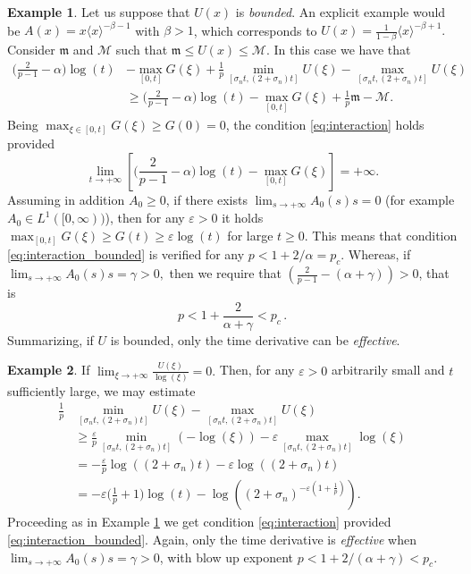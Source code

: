 \documentclass[11pt,reqno]{amsart}
\theoremstyle{definition}
\newtheorem{example}{Example}
\numberwithin{equation}{section}
\begin{document}
\begin{example}
\label{ex:boundedcase}
Let us suppose that $U(x)$ is \textit{bounded}. An explicit example would be $A(x)=x\langle  x\rangle^{-\beta-1}$ with $\beta>1$, which corresponds to $U(x)=\frac{1}{1-\beta} \langle x\rangle^{-\beta+1}.$  \\
Consider $\mathfrak{m}$ and $\mathcal{M}$ such that $\mathfrak{m}\leq U(x)\leq \mathcal{M}.$ In this case we have that
%
\begin{align*}
\Big(\frac{2}{p-1}-\alpha\Big)\log(t)&-\max_{[0,t]}G(\xi)
    +\frac{1}{p} \min_{[\sigma_n t,(2+\sigma_n)t]} U(\xi) -\max_{[\sigma_n t,(2+\sigma_n)t]} U(\xi) \\
 &   \geq \Big(\frac{2}{p-1}-\alpha\Big)\log(t)-\max_{[0,t]}G(\xi)
    +\frac{1}{p} \mathfrak{m}-\mathcal{M}. 
    \end{align*}
Being $\displaystyle{\max_{\xi\in [0,t]}G(\xi)}\geq G(0)=0$, the condition \eqref{eq:interaction} holds provided
\begin{equation}
\label{eq:interaction_bounded}
    \lim_{t\to+\infty} \left[\Big(\frac{2}{p-1}-\alpha\Big)\log(t)-\max_{[0,t]}G(\xi)\right]
    =+\infty.
\end{equation}
Assuming in addition $A_0\geq 0$, if there exists $\displaystyle{\lim_{s\to +\infty}}A_0(s)s=0$ (for example $A_0\in L^1([0,\infty))$), then for any $\varepsilon>0$ it holds $\displaystyle{\max_{[0,t]}G(\xi)\geq G(t)\geq \varepsilon\log(t)} $ for large $t\geq 0$. This means that condition \eqref{eq:interaction_bounded} is verified for any $p<1+2/\alpha=p_c$. 
Whereas, if $\displaystyle{\lim_{s\to +\infty}}A_0(s)s=\gamma>0,$ then we require that  $\left(\frac{2}{p-1}-\left(\alpha+\gamma\right)\right)>0$, that is 
\[p<1+\frac{2}{\alpha+\gamma}<p_c\,.\]
Summarizing, if $U$ is bounded,  only the time derivative can be \emph{effective}.
\end{example}
\begin{example}\label{ex:3}
If $\displaystyle{\lim_{\xi \to+\infty}}\frac{U(\xi)}{\log(\xi)}= 0.$ 
Then, for any $\varepsilon>0$ arbitrarily small and $t$ sufficiently large, we may estimate
%
\begin{align*}
\frac{1}{p} &\min_{[\sigma_n t,(2+\sigma_n)t]} U(\xi) -\max_{[\sigma_n t,(2+\sigma_n)t]} U(\xi) \\
 &   \geq 
    \frac{\varepsilon }{p} \min_{[\sigma_n t,(2+\sigma_n)t]} (-\log (\xi)) - \varepsilon \max_{[\sigma_n t,(2+\sigma_n)t]} \log (\xi) \\
%
 &   = 
    -\frac{\varepsilon }{p} \log ((2+\sigma_n) t) - \varepsilon \log ((2+\sigma_n)t)\\
%
& = -\varepsilon\Big(\frac{1}{p}+1\Big)\log(t)- \log\left((2+\sigma_n)^{-\varepsilon(1+\frac{1}{p})}\right).
    \end{align*}
%
Proceeding as in Example \ref{ex:boundedcase} we get
condition \eqref{eq:interaction} provided \eqref{eq:interaction_bounded}. Again, only the time derivative is \emph{effective} when $\displaystyle{\lim_{s\to +\infty}}A_0(s)s=\gamma>0$, with blow up exponent $p<1+2/(\alpha+\gamma)<p_c$.
\end{example}
\end{document}
